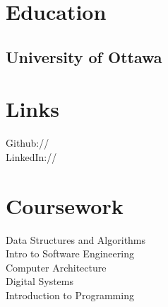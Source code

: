 \documentclass[]{resume}
\begin{document}
%
%


%
%

\begin{minipage}[t]{0.33\textwidth} 


\section{Education} 
\subsection{University of Ottawa}
\sectionsep


\section{Links} 
Github:// \href{https://https://github.com/Suri111200}{} \\
LinkedIn://  \href{https://www.linkedin.com/in/soorya-s}{} \\
\sectionsep


\section{Coursework}
Data Structures and Algorithms \\
Intro to Software Engineering \\
Computer Architecture \\
Digital Systems \\
Introduction to Programming\\
\sectionsep



\end{minipage}
\end{document}
